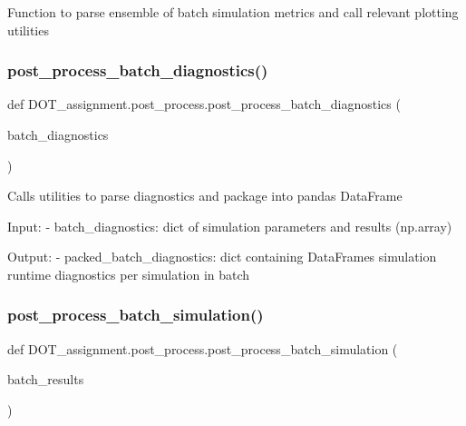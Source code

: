 \begin{DoxyVerb}Function to parse ensemble of batch simulation metrics and call relevant plotting utilities
\end{DoxyVerb}
 \mbox{\label{namespace_d_o_t__assignment_1_1post__process_a173a9e602939fed90b0066290955da75}} 
\subsubsection{\texorpdfstring{post\_process\_batch\_diagnostics()}{post\_process\_batch\_diagnostics()}}
{\footnotesize\ttfamily def D\+O\+T\+\_\+assignment.\+post\+\_\+process.\+post\+\_\+process\+\_\+batch\+\_\+diagnostics (\begin{DoxyParamCaption}\item[{}]{batch\+\_\+diagnostics }\end{DoxyParamCaption})}

\begin{DoxyVerb}Calls utilities to parse diagnostics and package into pandas DataFrame

Input:
- batch_diagnostics:            dict of simulation parameters and results (np.array)

Output:
- packed_batch_diagnostics:     dict containing DataFrames simulation runtime diagnostics per simulation in batch\end{DoxyVerb}
 \mbox{\label{namespace_d_o_t__assignment_1_1post__process_a03dba68b980b5e4cf8a5cec548972679}} 
\subsubsection{\texorpdfstring{post\_process\_batch\_simulation()}{post\_process\_batch\_simulation()}}
{\footnotesize\ttfamily def D\+O\+T\+\_\+assignment.\+post\+\_\+process.\+post\+\_\+process\+\_\+batch\+\_\+simulation (\begin{DoxyParamCaption}\item[{}]{batch\+\_\+results }\end{DoxyParamCaption})}

